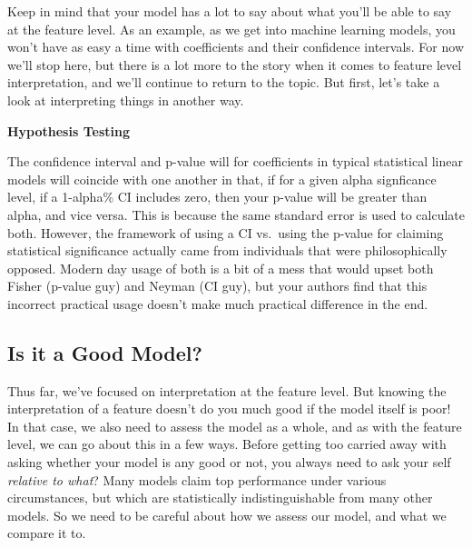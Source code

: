 \documentclass[
  letterpaper,
]{krantz}
\begin{document}
Keep in mind that your model has a lot to say about what you'll be able
to say at the feature level. As an example, as we get into machine
learning models, you won't have as easy a time with coefficients and
their confidence intervals. For now we'll stop here, but there is a lot
more to the story when it comes to feature level interpretation, and
we'll continue to return to the topic. But first, let's take a look at
interpreting things in another way.

\begin{tcolorbox}[enhanced jigsaw, bottomrule=.15mm, rightrule=.15mm, colframe=quarto-callout-tip-color-frame, colback=white, breakable, arc=.35mm, left=2mm, opacityback=0, leftrule=.75mm, toprule=.15mm]

\vspace{-3mm}\textbf{Hypothesis Testing}\vspace{3mm}

The confidence interval and p-value will for coefficients in typical
statistical linear models will coincide with one another in that, if for
a given alpha signficance level, if a 1-alpha\% CI includes zero, then
your p-value will be greater than alpha, and vice versa. This is because
the same standard error is used to calculate both. However, the
framework of using a CI vs.~using the p-value for claiming statistical
significance actually came from individuals that were philosophically
opposed. Modern day usage of both is a bit of a mess that would upset
both Fisher (p-value guy) and Neyman (CI guy), but your authors find
that this incorrect practical usage doesn't make much practical
difference in the end.

\end{tcolorbox}

\subsection{Is it a Good Model?}\label{sec-lm-interpretation-model}

Thus far, we've focused on interpretation at the feature level. But
knowing the interpretation of a feature doesn't do you much good if the
model itself is poor! In that case, we also need to assess the model as
a whole, and as with the feature level, we can go about this in a few
ways. Before getting too carried away with asking whether your model is
any good or not, you always need to ask your self \emph{relative to
what}? Many models claim top performance under various circumstances,
but which are statistically indistinguishable from many other models. So
we need to be careful about how we assess our model, and what we compare
it to.
\end{document}
